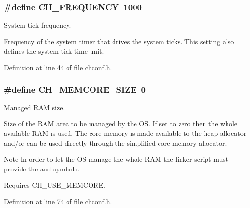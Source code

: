 \hypertarget{group__config_ga195ab8ff3340a18d4513cbaf915078f2}{}
\subsubsection[{C\+H\+\_\+\+F\+R\+E\+Q\+U\+E\+N\+C\+Y}]{\setlength{\rightskip}{0pt plus 5cm}\#define C\+H\+\_\+\+F\+R\+E\+Q\+U\+E\+N\+C\+Y~1000}\label{group__config_ga195ab8ff3340a18d4513cbaf915078f2}


System tick frequency. 

Frequency of the system timer that drives the system ticks. This setting also defines the system tick time unit. 

Definition at line 44 of file chconf.\+h.

\hypertarget{group__config_gac73902e3c40b375483f9dde71e83253d}{}
\subsubsection[{C\+H\+\_\+\+M\+E\+M\+C\+O\+R\+E\+\_\+\+S\+I\+Z\+E}]{\setlength{\rightskip}{0pt plus 5cm}\#define C\+H\+\_\+\+M\+E\+M\+C\+O\+R\+E\+\_\+\+S\+I\+Z\+E~0}\label{group__config_gac73902e3c40b375483f9dde71e83253d}


Managed R\+A\+M size. 

Size of the R\+A\+M area to be managed by the O\+S. If set to zero then the whole available R\+A\+M is used. The core memory is made available to the heap allocator and/or can be used directly through the simplified core memory allocator.

\begin{DoxyNote}{Note}
In order to let the O\+S manage the whole R\+A\+M the linker script must provide the {} and {} symbols. 

Requires {\ttfamily C\+H\+\_\+\+U\+S\+E\+\_\+\+M\+E\+M\+C\+O\+R\+E}. 
\end{DoxyNote}


Definition at line 74 of file chconf.\+h.

\hypertarget{group__config_gac7ceed3b75958cb6f7a977aab5ee249f}{}
